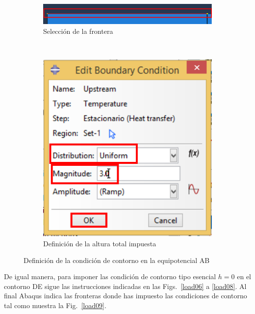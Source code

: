 \begin{figure}[!h]
    \begin{subfigure}[!h]{0.52\textwidth}
      \includegraphics[width=\textwidth]{./body/images/load04.pdf}
      \caption{Selección de la frontera}
      \label{load04}
    \end{subfigure}%
    ~ %
    \begin{subfigure}[!h]{0.45\textwidth}
      \includegraphics[width=\textwidth]{./body/images/load05.pdf}
      \caption{Definición de la altura total impuesta}
      \label{load05}
    \end{subfigure}%
    \caption{Definición de la condición de contorno en la
      equipotencial AB}
  \end{figure}

  De igual manera, para imponer las condición de contorno tipo
  esencial $h=0$ en el contorno DE sigue las instrucciones indicadas
  en las Figs.~\ref{load06} a \ref{load08}. Al final Abaqus indica las
  fronteras donde has impuesto las condiciones de contorno tal como
  muestra la Fig.~\ref{load09}.

